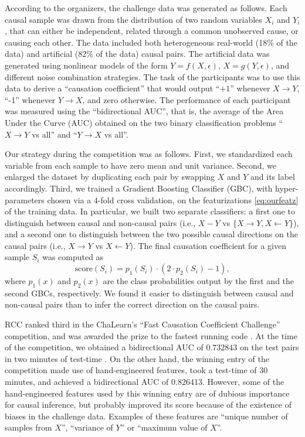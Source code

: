 \documentclass[twoside,11pt,a4paper]{article}
\begin{document}
According to the organizers, the challenge data was generated as follows. Each
causal sample was drawn from the distribution of two random variables $X_i$ and
$Y_i$, that can either be independent, related through a common unobserved
cause, or causing each other.  The data included both heterogeneous real-world
(18\% of the data) and artificial (82\% of the data) causal pairs. The
artificial data was generated using nonlinear models of the form
$Y=f(X,\epsilon)$, $X=g(Y,\epsilon)$, and different noise combination
strategies.  The task of the participants was to use this data to derive a
``causation coefficient'' that would output ``$+1$'' whenever $X \rightarrow
Y$, ``-1'' whenever $Y \rightarrow X$, and zero otherwise. The performance of
each participant was measured using the ``bidirectional AUC'', that is, the
average of the Area Under the Curve (AUC) obtained on the two binary
classification problems ``$X \rightarrow Y$ vs all'' and ``$Y \rightarrow X$ vs
all''.

Our strategy during the competition was as follows. First, we standardized each
variable from each sample to have zero mean and unit variance. Second, we
enlarged the dataset by duplicating each pair by swapping $X$ and $Y$ and its
label accordingly.
%
Third, we trained a Gradient Boosting Classifier (GBC), with hyper-parameters
chosen via a 4-fold cross validation, on the featurizations \eqref{eq:ourfeatz}
of the training data. In particular, we built two separate classifiers: a first
one to distinguish between causal and non-causal pairs (i.e., $X-Y$ vs
$\{X\rightarrow Y, X\leftarrow Y\}$), and a second one to distinguish between
the two possible causal directions on the causal pairs (i.e., $X\rightarrow Y$
vs $X\leftarrow Y$). The final causation coefficient for a given sample $S_i$
was computed as $$\mathrm{score}(S_i) = p_1(S_i)\cdot(2\cdot p_2(S_i)-1),$$
where $p_1(x)$ and $p_2(x)$ are the class probabilities output by the first and the
second GBCs, respectively. We found it easier to distinguish between causal and
non-causal pairs than to infer the correct direction on the causal pairs.

RCC ranked third in the ChaLearn's ``Fast Causation Coefficient Challenge''
competition, and was awarded the prize to the fastest running code
\citep{Codalab14}.
%
At the time of the competition, we obtained a bidirectional AUC of $0.732843$
on the test pairs in two minutes of test-time \cite{Codalab14}.
%
On the other hand, the winning entry of the competition made use of
hand-engineered features, took a test-time of 30 minutes, and achieved a
bidirectional AUC of $0.826413$.
%
However, some of the hand-engineered features used by this winning entry are of
dubious importance for causal inference, but probably improved its score 
because of the existence of biases in  the challenge data. Examples of these
features are ``unique number of samples from $X$'', ``variance of $Y$'' or
``maximum value of $X$''. 
\end{document}
